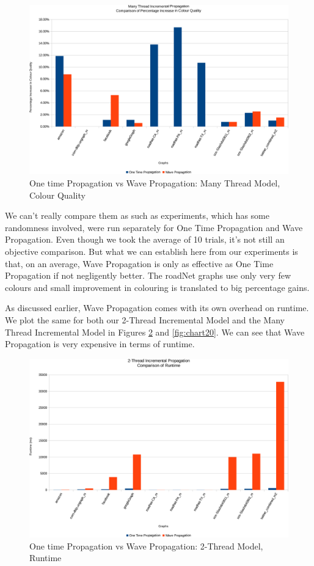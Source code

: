 \documentclass[MTech]{iitmdiss}
\begin{document}
\begin{figure}[h]
    \centering
    \includegraphics[width=\textwidth,keepaspectratio=true]{chartNewest34.pdf}
    \caption{
        One time Propagation vs Wave Propagation: Many Thread Model, Colour Quality
    }
    \label{fig:chart18}
\end{figure}
 
We can't really compare them as such as experiments, which has some randomness involved, were run separately for One Time Propagation and Wave Propagation. Even though we took the average of 10 trials, it's not still an objective comparison. But what we can establish here from our experiments is that, on an average, Wave Propagation is only as effective as One Time Propagation if not negligently better. The roadNet graphs use only very few colours and small improvement in colouring is translated to big percentage gains.

As discussed earlier, Wave Propagation comes with its own overhead on runtime. We plot the same for both our 2-Thread Incremental Model and the Many Thread Incremental Model in Figures \ref{fig:chart19} and \ref{fig:chart20}. We can see that Wave Propagation is very expensive in terms of runtime.

\begin{figure}[h]
    \centering
    \includegraphics[width=\textwidth,keepaspectratio=true]{chartNewest33.pdf}
    \caption{
        One time Propagation vs Wave Propagation: 2-Thread Model, Runtime
    }
    \label{fig:chart19}
\end{figure}
\end{document}
